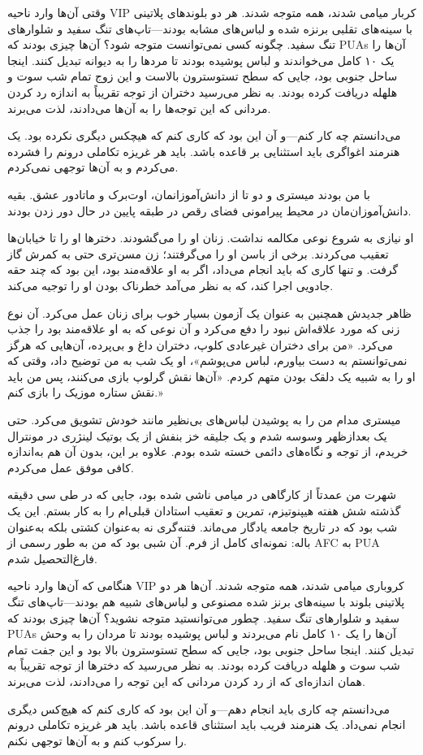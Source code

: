 وقتی آن‌ها وارد ناحیه VIP کربار میامی شدند، همه متوجه شدند. هر دو بلوندهای پلاتینی با سینه‌های تقلبی برنزه شده و لباس‌های مشابه بودند—تاپ‌های تنگ سفید و شلوارهای تنگ سفید. چگونه کسی نمی‌توانست متوجه شود؟ آن‌ها چیزی بودند که PUAs آن‌ها را یک ۱۰ کامل می‌خواندند و لباس پوشیده بودند تا مردها را به دیوانه تبدیل کنند. اینجا ساحل جنوبی بود، جایی که سطح تستوسترون بالاست و این زوج تمام شب سوت و هلهله دریافت کرده بودند. به نظر می‌رسید دختران از توجه تقریباً به اندازه رد کردن مردانی که این توجه‌ها را به آن‌ها می‌دادند، لذت می‌برند.

می‌دانستم چه کار کنم—و آن این بود که کاری کنم که هیچکس دیگری نکرده بود. یک هنرمند اغواگری باید استثنایی بر قاعده باشد. باید هر غریزه تکاملی درونم را فشرده می‌کردم و به آن‌ها توجهی نمی‌کردم.

با من بودند میستری و دو تا از دانش‌آموزانمان، اوت‌برک و ماتادور عشق. بقیه دانش‌آموزان‌مان در محیط پیرامونی فضای رقص در طبقه پایین در حال دور زدن بودند.

او نیازی به شروع نوعی مکالمه نداشت. زنان او را می‌گشودند. دخترها او را تا خیابان‌ها تعقیب می‌کردند. برخی از باسن او را می‌گرفتند؛ زن مسن‌تری حتی به کمرش گاز گرفت. و تنها کاری که باید انجام می‌داد، اگر به او علاقه‌مند بود، این بود که چند حقه جادویی اجرا کند، که به نظر می‌آمد خطرناک بودن او را توجیه می‌کند.

ظاهر جدیدش همچنین به عنوان یک آزمون بسیار خوب برای زنان عمل می‌کرد. آن نوع زنی که مورد علاقه‌اش نبود را دفع می‌کرد و آن نوعی که به او علاقه‌مند بود را جذب می‌کرد. «من برای دختران غیرعادی کلوپ، دختران داغ و بی‌پرده، آن‌هایی که هرگز نمی‌توانستم به دست بیاورم، لباس می‌پوشم»، او یک شب به من توضیح داد، وقتی که او را به شبیه یک دلقک بودن متهم کردم. «آن‌ها نقش گرلوپ بازی می‌کنند، پس من باید نقش ستاره موزیک را بازی کنم.»

میستری مدام من را به پوشیدن لباس‌های بی‌نظیر مانند خودش تشویق می‌کرد. حتی یک بعدازظهر وسوسه شدم و یک جلیقه خز بنفش از یک بوتیک لینژری در مونترال خریدم، از توجه و نگاه‌های دائمی خسته شده بودم. علاوه بر این، بدون آن هم به‌اندازه کافی موفق عمل می‌کردم.

شهرت من عمدتاً از کارگاهی در میامی ناشی شده بود، جایی که در طی سی دقیقه گذشته شش هفته هیپنوتیزم، تمرین و تعقیب استادان قبلی‌ام را به کار بستم. این یک شب بود که در تاریخ جامعه یادگار می‌ماند. فتنه‌گری نه به‌عنوان کشتی بلکه به‌عنوان باله: نمونه‌ای کامل از فرم. آن شبی بود که من به طور رسمی از AFC به PUA فارغ‌التحصیل شدم.

هنگامی که آن‌ها وارد ناحیه VIP کروباری میامی شدند، همه متوجه شدند. آن‌ها هر دو پلاتینی بلوند با سینه‌های برنز شده مصنوعی و لباس‌های شبیه هم بودند—تاپ‌های تنگ سفید و شلوارهای تنگ سفید. چطور می‌توانستید متوجه نشوید؟ آن‌ها چیزی بودند که PUAs آن‌ها را یک ۱۰ کامل نام می‌بردند و لباس پوشیده بودند تا مردان را به وحش تبدیل کنند. اینجا ساحل جنوبی بود، جایی که سطح تستوسترون بالا بود و این جفت تمام شب سوت و هلهله دریافت کرده بودند. به نظر می‌رسید که دخترها از توجه تقریباً به همان اندازه‌ای که از رد کردن مردانی که این توجه را می‌دادند، لذت می‌برند.

می‌دانستم چه کاری باید انجام دهم—و آن این بود که کاری کنم که هیچ‌کس دیگری انجام نمی‌داد. یک هنرمند فریب باید استثنای قاعده باشد. باید هر غریزه تکاملی درونم را سرکوب کنم و به آن‌ها توجهی نکنم.